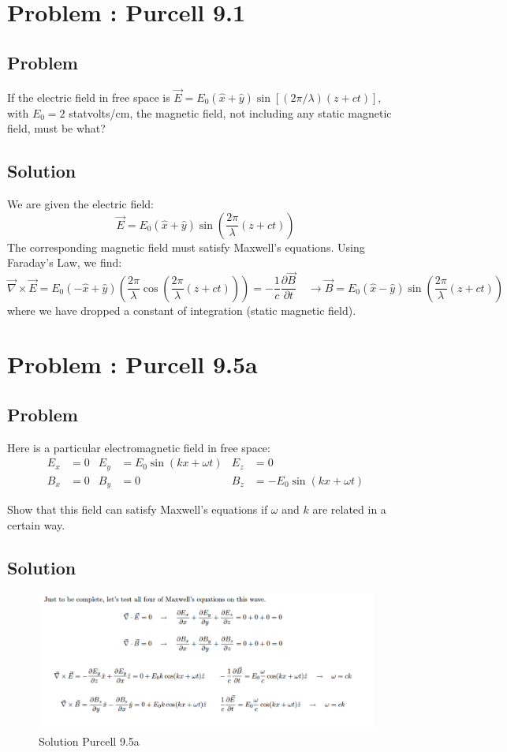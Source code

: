 \documentclass[solutions]{esg8022pset}
\begin{document}
\section{Problem \thesection: Purcell 9.1}
\subsection{Problem}
  If the electric field in free space is $\vec E = E_0(\hat x + \hat y)\sin\left[(2\pi / \lambda)(z + ct)\right]$,
  with $E_0 = 2$ statvolts/cm, the magnetic field, not
  including any static magnetic field, must be what?
\subsection{Solution}
  We are given the electric field:
  $$\vec E = E_0(\hat x + \hat y)\sin\left(\frac{2\pi}{\lambda} (z + ct)\right)$$
  The corresponding magnetic field must satisfy Maxwell's equations. Using Faraday's Law, we find:
  $$\vec \nabla \times \vec E = E_0(-\hat x + \hat y)\left(\frac{2\pi}{\lambda}\cos\left(\frac{2\pi}{\lambda}(z + ct)\right)\right) = -\frac{1}{c}\frac{\partial\vec{B}}{\partial t}
  \quad \longrightarrow
  \vec B = E_0(\hat x - \hat y)\sin\left(\frac{2\pi}{\lambda}(z + ct)\right)$$
  where we have dropped a constant of integration (static magnetic field).
\section{Problem \thesection: Purcell 9.5a}
\subsection{Problem}
  Here is a particular electromagnetic field in free space:
  \begin{align*}
    E_x & = 0  &
      E_y & = E_0 \sin(kx + \omega t) &
      E_z & = 0 \\
    B_x & = 0 &
      B_y & = 0 &
      B_z & = -E_0\sin(kx + \omega t)
  \end{align*}

  \noindent Show that this field can satisfy Maxwell's equations if $\omega$ and
  $k$ are related in a certain way.
\subsection{Solution}
  \begin{figure}[H]
    \centering
    \includegraphics[width = 15cm]{solpu905a}
    \caption{Solution Purcell 9.5a}
  \end{figure}
\end{document}
